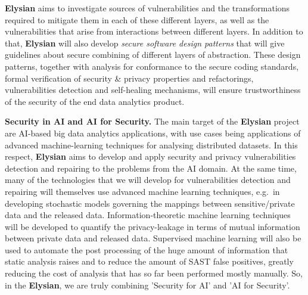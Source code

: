 \documentclass[a4paper,11pt]{article}
\newcommand{\project}[1]{\textbf{#1}\xspace}
\newcommand{\SECURITY}{\project{Elysian}}
\newcommand{\TheProject}{\SECURITY}
\begin{document}
\TheProject{} aims to investigate sources of vulnerabilities and the transformations required to mitigate them in each of these different layers, as well as the vulnerabilities that arise from interactions between different layers. In addition to that, \TheProject{} will also develop \emph{secure software design patterns} that will give guidelines about secure combining of different layers of abstraction. These design patterns, together with analysis for conformance to the secure coding standards, formal verification of security \& privacy properties and refactorings, vulnerabilities detection and self-healing mechanisms, will ensure trustworthiness of the security 
of the end data analytics product.

\begin{mdframed}[backgroundcolor=blue!5]
\textbf{Security in AI and AI for Security.}
The main target of the \TheProject{} project are AI-based big data analytics applications, with use cases being applications of advanced machine-learning techniques for analysing distributed datasets. In this respect, \TheProject{} aims to develop and apply security and privacy vulnerabilities detection and repairing to the problems from the AI domain. At the same time, many of the technologies that we will develop for vulnerabilities detection and repairing will themselves use advanced machine learning techniques, e.g.~in developing stochastic models governing the mappings between sensitive/private data and the released data. Information-theoretic machine learning techniques will be developed to quantify the privacy-leakage in terms of mutual information between private data and released data. Supervised machine learning will also be used to automate the post processing of the huge amount of information that static analysis raises and to reduce the amount of SAST false positives, greatly reducing the cost of analysis that has so far been performed mostly manually. So, in the \TheProject{}, we are truly combining 'Security for AI' and 'AI for Security'.
\end{mdframed}
\end{document}
